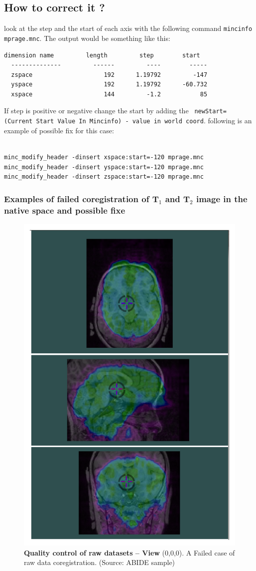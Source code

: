 \documentclass[12pt]{paper}%
\begin{document}
\subsection*{How to correct it ?}
look at the step and the start of each axis with the following command \lstinline|mincinfo mprage.mnc|. The output would be something like this: 

\lstset{language=bash}
\begin{lstlisting}
dimension name         length         step        start
  --------------         ------         ----        -----
  zspace                    192      1.19792         -147
  yspace                    192      1.19792      -60.732
  xspace                    144         -1.2           85
\end{lstlisting}

If step is positive or negative change the start by adding the \lstinline| newStart=(Current Start Value In Mincinfo) - value in world coord|. following is an example of possible fix for this case:\\%
\\
\lstset{language=bash}
\begin{lstlisting}
minc_modify_header -dinsert xspace:start=-120 mprage.mnc
minc_modify_header -dinsert yspace:start=-120 mprage.mnc
minc_modify_header -dinsert zspace:start=-120 mprage.mnc
\end{lstlisting}

\subsubsection{Examples of failed coregistration of T$_1$ and T$_2$ image in the native space and possible fixe}
\begin{figure}[htbp]
\captionsetup{justification=centering,margin=2cm}
\begin{center}
\includegraphics[width=0.333\linewidth]{fig_qc_raw_data_coregist_fail}
\caption{
{\textbf{Quality control of raw datasets -- View} ($0$,$0$,$0$).} {A Failed case of raw data coregistration. (Source: ABIDE sample)}
}
\label{fig_qc_raw_data_coregist_fail}
\end{center}
\end{figure}
\end{document}
